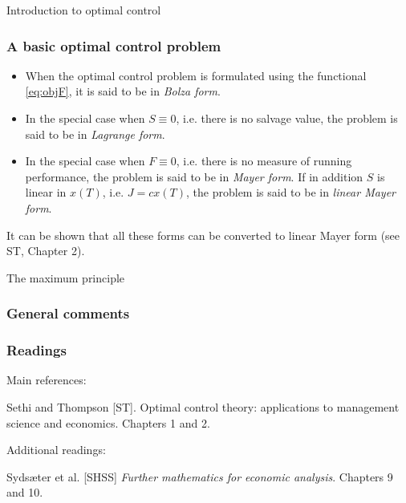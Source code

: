\documentclass[10pt]{beamer}
\theoremstyle{definition}
\begin{document}
\begin{section}{Introduction to optimal control}
\begin{frame}[fragile]
\frametitle{A basic optimal control problem}
\begin{itemize}\itemsep1em
\item When the optimal control problem is formulated using the functional \eqref{eq:objF}, it is said to be in \emph{Bolza form}.
\item In the special case when $ S\equiv 0 $, i.e. there is no salvage value, the problem is said to be in \emph{Lagrange form}.
\item In the special case when $ F\equiv 0 $, i.e. there is no measure of running performance, the problem is said to be in \emph{Mayer form}. If in addition $ S $ is linear in $ x(T) $, i.e. $ J=c x(T) $, the problem is said to be in \emph{linear Mayer form}.
\end{itemize}\bigskip\pause

\alert{It can be shown that all these forms can be converted to linear Mayer form (see ST, Chapter 2).}
\end{frame}
\end{section}

\begin{section}{The maximum principle}\label{sec:max}

\begin{frame}[fragile]
\frametitle{General comments}

\end{frame}








\end{section}
\begin{frame}[fragile]
\frametitle{Readings}
Main references:

Sethi and Thompson [ST]. Optimal control theory: applications to management science and economics. Chapters 1 and 2.\bigskip

Additional readings:

Syds\ae{}ter et al. [SHSS] \emph{Further mathematics for economic analysis}. Chapters 9 and 10.

\end{frame}
\end{document}
